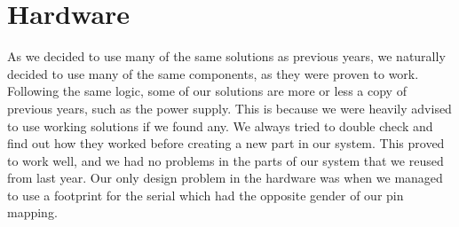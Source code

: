 \section {Hardware}

As we decided to use many of the same solutions as previous years, we naturally
decided to use many of the same components, as they were proven to
work. Following the same logic, some of our solutions are more or less a copy of
previous years, such as the power supply. This is because we were heavily
advised to use working solutions if we found any. We always
tried to double check and find out how they worked before creating a new part in
our system. This proved to work well, and we had no problems in the parts of our
system that we reused from last year. Our only design problem in the hardware was
when we managed to use a footprint for the serial which had the opposite gender
of our pin mapping.
